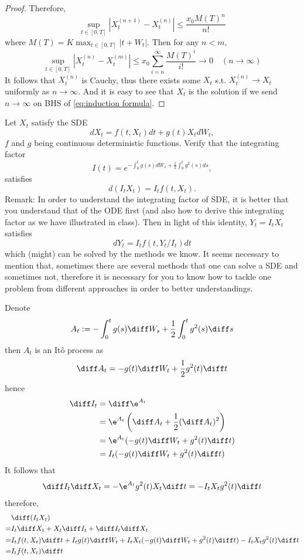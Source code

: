 \begin{proof}
        Therefore,
        \[\sup_{t\in[0,T]}
        \left|X_t^{(n+1)}-X_t^{(n)}\right|
        \leq\frac{x_0M(T)^n}{n!}\]
        where $M(T)=K\max_{t\in[0,T]}|t+W_t|$.
        Then for any $n<m$,
        \[\sup_{t\in[0,T]}\left|X_t^{(n)}-X_t^{(m)}\right|
        \leq x_0\sum_{i=n}^\infty\frac{M(T)^i}{i!}
        \to 0\quad (n\to\infty)\]
        It follows that $X_t^{(n)}$ is Cauchy,
        thus there exists some $X_t$ s.t.
        $X_t^{(n)}\to X_t$
        uniformly as $n\to\infty$.
        And it is easy to see that $X_t$ is the solution
        if we send $n\to\infty$ on BHS of \cref{eq:induction formula}.
    \end{proof}

    \problem
    \begin{question}
        Let $X_t$ satisfy the SDE
        \[dX_t=f(t,X_t)dt+g(t)X_tdW_t,\]
        $f$ and $g$ being continuous deterministic functions.  Verify that the integrating factor
        \[I(t)=e^{-\int_0^t g(s)dW_s+\frac{1}{2}\int_0^tg^2(s)ds},\]
        satisfies
        \[d(I_tX_t)=I_tf(t,X_t).\]
        Remark: In order to understand the integrating factor of SDE, it is better that you understand that of the ODE first (and also how to derive this integrating factor as we have illustrated in class).  Then in light of this identity, $Y_t=I_tX_t$ satisfies
        \[dY_t=I_tf(t,Y_t/I_t)dt\]
        which (might) can be solved by the methods we know.  It seems necessary to mention that, sometimes there are several methods that one can solve a SDE and sometimes not, therefore it is necessary for you to know how to tackle one problem from different approaches in order to better understandings.
    \end{question}
    Denote
    \[A_t:=-\int_0^tg(s)\diff W_s+\frac{1}{2}\int_0^tg^2(s)\diff s\]
    then $A_t$ is an It\^o process as
    \[\diff A_t=-g(t)\diff W_t+\frac{1}{2}g^2(t)\diff t\]
    hence
    \[\begin{aligned}
        \diff I_t&=\diff \e^{A_t}\\
        &=\e^{A_t}\left(\diff A_t+\frac{1}{2}(\diff A_t)^2\right)\\
        &=\e^{A_t}(-g(t)\diff W_t+g^2(t)\diff t)\\
        &=I_t(-g(t)\diff W_t+g^2(t)\diff t)
    \end{aligned}\]
    It follows that
    \[\diff I_t\diff X_t=-\e^{A_t}g^2(t)X_t\diff t=-I_tX_tg^2(t)\diff t\]
    therefore,
    \[\begin{aligned}
        &\diff(I_tX_t)\\
        =&I_t\diff X_t+X_t\diff I_t+\diff I_t\diff X_t\\
        =&I_tf(t,X_t)\diff t+I_tg(t)\diff W_t+I_tX_t(-g(t)\diff W_t+g^2(t)\diff t)
        -I_tX_tg^2(t)\diff t\\
        =&I_tf(t,X_t)\diff t
    \end{aligned}\]

